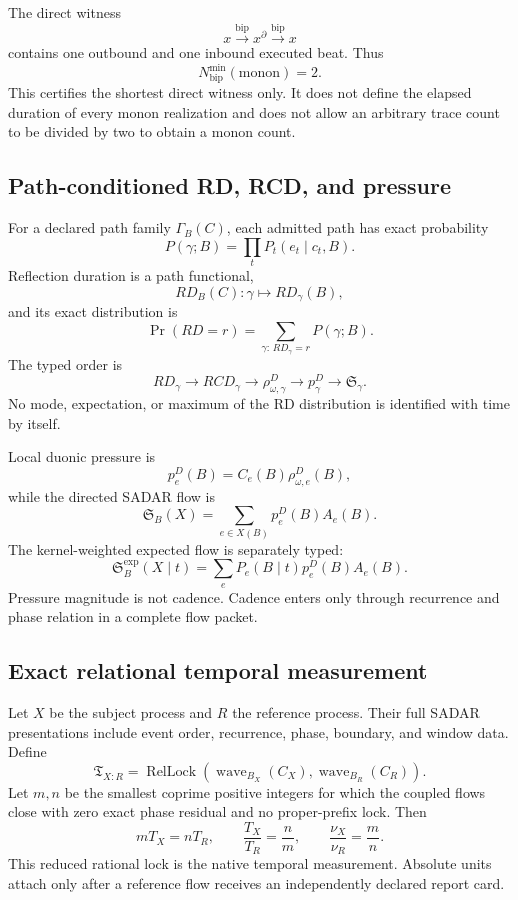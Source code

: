 The direct witness
\[
x\xrightarrow{\mathrm{bip}}x^\partial
 \xrightarrow{\mathrm{bip}}x
\]
contains one outbound and one inbound executed beat.  Thus
\[
\boxed{N_{\mathrm{bip}}^{\min}(\mathrm{monon})=2.}
\]
This certifies the shortest direct witness only.  It does not define the
elapsed duration of every monon realization and does not allow an arbitrary
trace count to be divided by two to obtain a monon count.

\subsection{Path-conditioned RD, RCD, and pressure}

For a declared path family \(\Gamma_B(C)\), each admitted path has exact
probability
\[
P(\gamma;B)=\prod_t P_t(e_t\mid c_t,B).
\]
Reflection duration is a path functional,
\[
RD_B(C):\gamma\longmapsto RD_\gamma(B),
\]
and its exact distribution is
\[
\Pr(RD=r)=
\sum_{\gamma:\,RD_\gamma=r}P(\gamma;B).
\]
The typed order is
\[
RD_\gamma
\longrightarrow
RCD_\gamma
\longrightarrow
\rho_{\omega,\gamma}^{D}
\longrightarrow
p_{\gamma}^{D}
\longrightarrow
\mathfrak S_\gamma.
\]
No mode, expectation, or maximum of the RD distribution is identified with
time by itself.

Local duonic pressure is
\[
p_e^D(B)=C_e(B)\rho_{\omega,e}^{D}(B),
\]
while the directed SADAR flow is
\[
\mathfrak S_B(X)=
\sum_{e\in X(B)}p_e^D(B)A_e(B).
\]
The kernel-weighted expected flow is separately typed:
\[
\mathfrak S_B^{\mathrm{exp}}(X\mid t)=
\sum_e P_e(B\mid t)p_e^D(B)A_e(B).
\]
Pressure magnitude is not cadence.  Cadence enters only through recurrence and
phase relation in a complete flow packet.

\subsection{Exact relational temporal measurement}

Let \(X\) be the subject process and \(R\) the reference process.  Their full
SADAR presentations include event order, recurrence, phase, boundary, and
window data.  Define
\[
\mathfrak T_{X:R}
=
\operatorname{RelLock}
\left(
\operatorname{wave}_{B_X}(C_X),
\operatorname{wave}_{B_R}(C_R)
\right).
\]
Let \(m,n\) be the smallest coprime positive integers for which the coupled
flows close with zero exact phase residual and no proper-prefix lock.  Then
\[
mT_X=nT_R,
\qquad
\boxed{\frac{T_X}{T_R}=\frac{n}{m}},
\qquad
\boxed{\frac{\nu_X}{\nu_R}=\frac{m}{n}}.
\]
This reduced rational lock is the native temporal measurement.  Absolute
units attach only after a reference flow receives an independently declared
report card.

